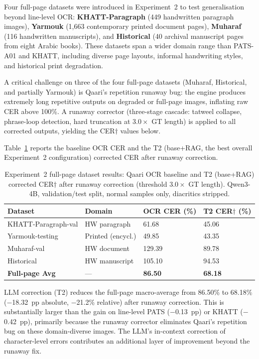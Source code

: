 Four full-page datasets were introduced in Experiment~2 to test
generalisation beyond line-level OCR: \textbf{KHATT-Paragraph}
(449 handwritten paragraph images), \textbf{Yarmouk} (1{,}663 contemporary
printed document pages), \textbf{Muharaf} (116 handwritten manuscripts), and
\textbf{Historical} (40 archival manuscript pages from eight Arabic books).
These datasets span a wider domain range than PATS-A01 and KHATT, including
diverse page layouts, informal handwriting styles, and historical print degradation.

A critical challenge on three of the four full-page datasets (Muharaf,
Historical, and partially Yarmouk) is Qaari's repetition runaway bug: the
engine produces extremely long repetitive outputs on degraded or full-page
images, inflating raw CER above 100\%. A runaway corrector (three-stage cascade:
tatweel collapse, phrase-loop detection, hard truncation at $3.0\times$ GT
length) is applied to all corrected outputs, yielding the CER$\dagger$ values
below.

Table~\ref{tab:exp2_fullpage} reports the baseline OCR CER and the T2
(base+RAG, the best overall Experiment~2 configuration) corrected CER after
runaway correction.

\begin{table}[htbp]
  \centering
  \caption{Experiment~2 full-page dataset results: Qaari OCR baseline and
           T2 (base+RAG) corrected CER$\dagger$ after runaway correction
           (threshold $3.0\times$ GT length). Qwen3-4B, validation/test
           split, normal samples only, diacritics stripped.}
  \label{tab:exp2_fullpage}
  \begin{tabularx}{\textwidth}{lXXX}
    \toprule
    \textbf{Dataset} & \textbf{Domain}
      & \textbf{OCR CER (\%)} & \textbf{T2 CER$\dagger$ (\%)} \\
    \midrule
    KHATT-Paragraph-val & HW paragraph     & 61.68  & 45.06 \\
    Yarmouk-testing     & Printed (encycl.) & 49.85  & 43.35 \\
    Muharaf-val         & HW document      & 129.39 & 89.78 \\
    Historical          & HW manuscript    & 105.10 & 94.53 \\
    \midrule
    \textbf{Full-page Avg} & --- & \textbf{86.50} & \textbf{68.18} \\
    \bottomrule
  \end{tabularx}
\end{table}

LLM correction (T2) reduces the full-page macro-average from 86.50\% to
68.18\% ($-$18.32~pp absolute, $-$21.2\% relative) after runaway correction.
This is substantially larger than the gain on line-level PATS ($-$0.13~pp)
or KHATT ($-$0.42~pp), primarily because the runaway corrector eliminates
Qaari's repetition bug on these domain-diverse images. The LLM's in-context
correction of character-level errors contributes an additional layer of
improvement beyond the runaway fix.

